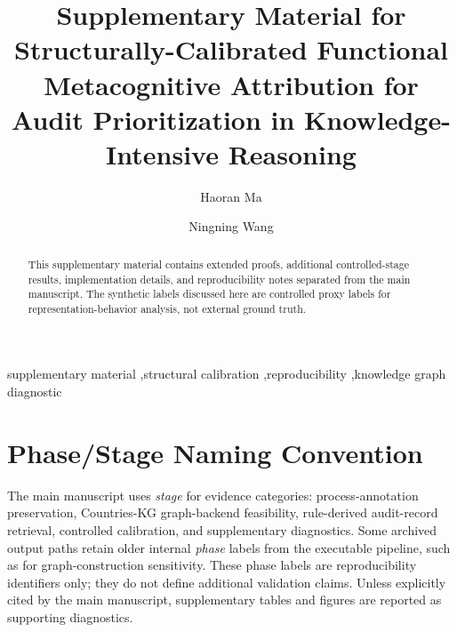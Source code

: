 \documentclass[a4paper,fleqn]{cas-sc}
\begin{document}
\let\WriteBookmarks\relax
\def\floatpagepagefraction{1}
\def\textpagefraction{.001}


\title[mode=title]{Supplementary Material for Structurally-Calibrated Functional Metacognitive Attribution for Audit Prioritization in Knowledge-Intensive Reasoning}

\author[1]{Haoran Ma}

\author[1,2]{Ningning Wang}




\begin{abstract}
This supplementary material contains extended proofs, additional controlled-stage results, implementation details, and reproducibility notes separated from the main manuscript. The synthetic labels discussed here are controlled proxy labels for representation-behavior analysis, not external ground truth.
\end{abstract}

\begin{keywords}
supplementary material \sep structural calibration \sep reproducibility \sep knowledge graph diagnostic
\end{keywords}

\maketitle

\section*{Phase/Stage Naming Convention}
The main manuscript uses \emph{stage} for evidence categories: process-annotation preservation, Countries-KG graph-backend feasibility, rule-derived audit-record retrieval, controlled calibration, and supplementary diagnostics. Some archived output paths retain older internal \emph{phase} labels from the executable pipeline, such as  for graph-construction sensitivity. These phase labels are reproducibility identifiers only; they do not define additional validation claims. Unless explicitly cited by the main manuscript, supplementary tables and figures are reported as supporting diagnostics.
\end{document}
